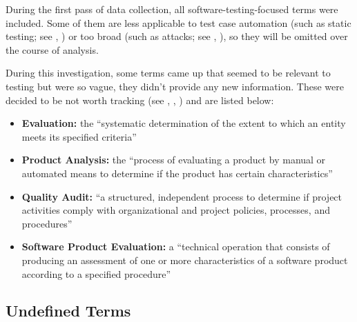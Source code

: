 During the first pass of data collection, all software-testing-focused terms
were included. Some of them are less applicable to test case automation
(such as static testing; see , )
or too broad (such as attacks; see
, ), so they will be omitted over the
course of analysis.

\ifnotpaper
      During this investigation, some terms came up that seemed to be relevant to
      testing but were so vague, they didn't provide any new information. These were
      decided to be not worth tracking (see , ,
      ) and are listed below:

      \begin{itemize}
            \item \textbf{Evaluation:} the ``systematic determination of the extent
                  to which an entity meets its specified criteria''
                  \citep[p.~167]{IEEE2017}
            \item \textbf{Product Analysis:} the ``process of evaluating a product by
                  manual or automated means to determine if the product has certain
                  characteristics'' \citep[p.~343]{IEEE2017}
            \item \textbf{Quality Audit:} ``a structured, independent process to
                  determine if project activities comply with organizational and
                  project policies, processes, and procedures'' \citep[p.~361]{IEEE2017}
            \item \textbf{Software Product Evaluation:} a ``technical operation that
                  consists of producing an assessment of one or more characteristics
                  of a software product according to a specified procedure''
                  \citep[p.~424]{IEEE2017}
      \end{itemize}
\fi

\subsection{Undefined Terms}
\label{undef-terms}


\newcount\TotalBefore
\newcount\TotalAfter
\newcount\UndefBefore
\newcount\UndefAfter


